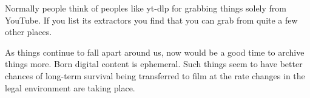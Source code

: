 Normally people think of peoples like yt-dlp for grabbing things solely
from YouTube. If you list its extractors you find that you can grab from
quite a few other places.

As things continue to fall apart around us, now would be a good time to
archive things more. Born digital content is ephemeral. Such things seem
to have better chances of long-term survival being transferred to film
at the rate changes in the legal environment are taking place.
